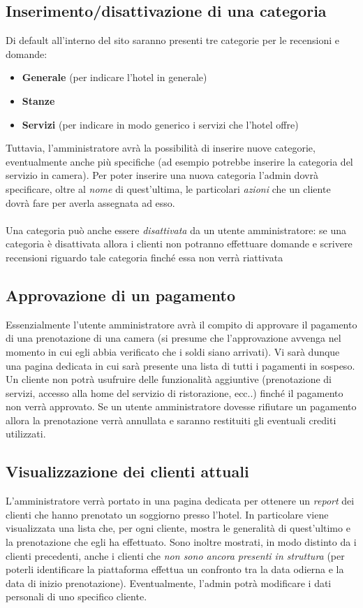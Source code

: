 \documentclass [a4paper, 12pt]{book}
\begin{document}
\medskip

\subsection{Inserimento/disattivazione di una categoria} 
Di default all'interno del sito saranno presenti tre categorie per le recensioni e domande:
\begin{itemize}
\item \textbf{Generale} (per indicare l'hotel in generale)
\item \textbf{Stanze}
\item \textbf{Servizi} (per indicare in modo generico i servizi che l'hotel offre)
\end{itemize}
Tuttavia, l'amministratore avrà la possibilità di inserire nuove categorie, eventualmente anche più specifiche (ad esempio potrebbe inserire la categoria del servizio in camera). Per poter inserire una nuova categoria l'admin dovrà specificare, oltre al \textit{nome} di quest'ultima, le particolari \textit{azioni} che un cliente dovrà fare per averla assegnata ad esso.\\\\
Una categoria può anche essere \textit{disattivata} da un utente amministratore: se una categoria è disattivata allora i clienti non potranno effettuare domande e scrivere recensioni riguardo tale categoria finché essa non verrà riattivata

\medskip

\subsection{Approvazione di un pagamento}
Essenzialmente l'utente amministratore avrà il compito di approvare il pagamento di una prenotazione di una camera (si presume che l'approvazione avvenga nel momento in cui egli abbia verificato che i soldi siano arrivati). Vi sarà dunque una pagina dedicata in cui sarà presente una lista di tutti i pagamenti in sospeso. Un cliente non potrà usufruire delle funzionalità aggiuntive (prenotazione di servizi, accesso alla home del servizio di ristorazione, ecc..) finché il pagamento non verrà approvato. Se un utente amministratore dovesse rifiutare un pagamento allora la prenotazione verrà annullata e saranno restituiti gli eventuali crediti utilizzati.
\subsection{Visualizzazione dei clienti attuali}
L'amministratore verrà portato in una pagina dedicata per ottenere un \textit{report} dei clienti che hanno prenotato un soggiorno presso l'hotel. In particolare viene visualizzata una lista che, per ogni cliente, mostra le generalità di quest'ultimo e la prenotazione che egli ha effettuato. Sono inoltre mostrati, in modo distinto da i clienti precedenti, anche i clienti che \textit{non sono ancora presenti in struttura} (per poterli identificare la piattaforma effettua un confronto tra la data odierna e la data di inizio prenotazione). Eventualmente, l'admin potrà modificare i dati personali di uno specifico cliente.
\end{document}

